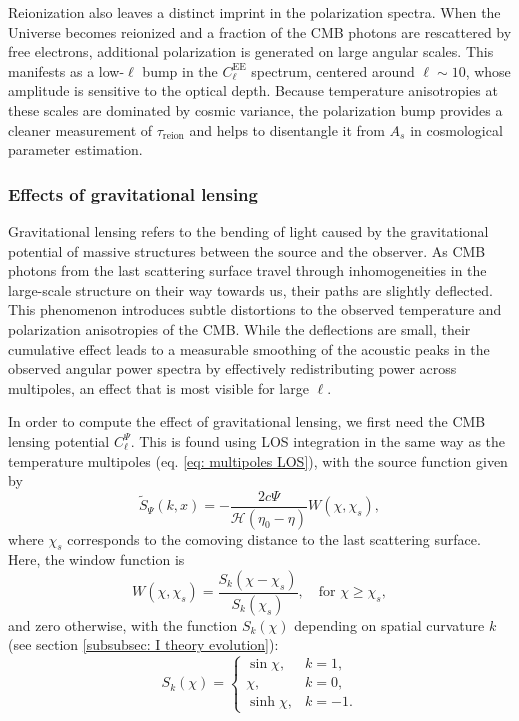 \documentclass{aa}
\numberwithin{equation}{section}
\numberwithin{table}{section}
\numberwithin{figure}{section}
\begin{document}
Reionization also leaves a distinct imprint in the polarization spectra. When the Universe becomes reionized and a fraction of the CMB photons are rescattered by free electrons, additional polarization is generated on large angular scales. This manifests as a low-$\ell$ bump in the $C_\ell^{\text{EE}}$ spectrum, centered around $\ell \sim 10$, whose amplitude is sensitive to the optical depth. Because temperature anisotropies at these scales are dominated by cosmic variance, the polarization bump provides a cleaner measurement of $\tau_{\text{reion}}$ and helps to disentangle it from $A_s$ in cosmological parameter estimation.




\subsubsection{Effects of gravitational lensing}\label{subsubsec: IV theory lensing}
Gravitational lensing refers to the bending of light caused by the gravitational potential of massive structures between the source and the observer. As CMB photons from the last scattering surface travel through inhomogeneities in the large-scale structure on their way towards us, their paths are slightly deflected. This phenomenon introduces subtle distortions to the observed temperature and polarization anisotropies of the CMB. While the deflections are small, their cumulative effect leads to a measurable smoothing of the acoustic peaks in the observed angular power spectra by effectively redistributing power across multipoles, an effect that is most visible for large $\ell$.

In order to compute the effect of gravitational lensing, we first need the CMB lensing potential $C_\ell^\Psi$. This is found using LOS integration in the same way as the temperature multipoles (eq. \eqref{eq: multipoles LOS}), with the source function given by
\begin{equation}
\tilde{S}_\Psi(k,x) = -\frac{2c\Psi}{\mathcal{H}(\eta_0 - \eta)} W(\chi, \chi_s), \label{eq: source_Psi}
\end{equation}
where $\chi_s$ corresponds to the comoving distance to the last scattering surface. Here, the window function is
\begin{equation}
W(\chi, \chi_s) = \frac{S_k(\chi - \chi_s)}{S_k(\chi_s)}, \quad \text{for } \chi \geq \chi_s,
\end{equation}
and zero otherwise, with the function $S_k(\chi)$ depending on spatial curvature $k$ (see section \ref{subsubsec: I theory evolution}):
\begin{equation}
  S_k(\chi) = 
  \begin{cases}
  \sin\chi, & k = 1 , \\
  \chi, & k = 0, \\
  \sinh\chi, & k = -1.
\end{cases}
\end{equation}
\end{document}
